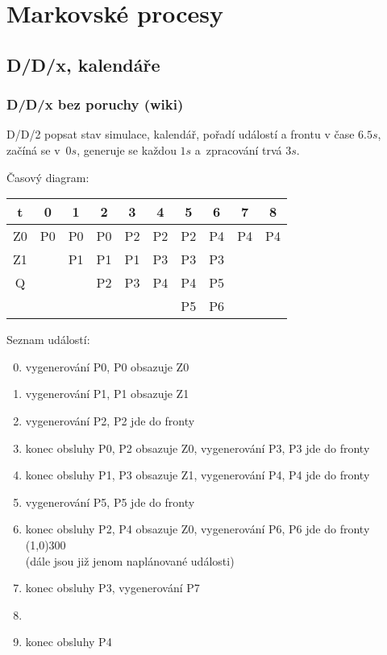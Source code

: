 \documentclass[11pt]{article} %
\begin{document}

\newpage
\section{Markovské procesy}

\subsection{D/D/x, kalendáře}

\subsubsection{D/D/x bez poruchy (wiki)}
D/D/2 popsat stav simulace, kalendář, pořadí událostí a frontu v čase $6.5s$, začíná se v~$0s$, generuje se každou $1s$ a~zpracování trvá $3s$.
\vskip 0.25cm

\noindent
Časový diagram:
\vskip 0.1cm

\begin{tabular}{|c||ccccccc|cc|}
\hline
t & 0 & 1 & 2 & 3 & 4 & 5 & 6 & 7 & 8 \\
\hline
\hline
Z0 & P0 & P0 & P0 & P2 & P2 & P2 & P4 & P4  & P4\\
Z1 & & P1 & P1 & P1 & P3 & P3 & P3 & &\\
\hline
Q & & & P2 & P3 & P4 & P4 & P5 & & \\
 & & & & & & P5 & P6 & & \\
\hline
\end{tabular}

\vskip 0.3cm
\noindent
Seznam událostí:
\begin{enumerate}
\setcounter{enumi}{-1}
\item
 vygenerování P0, P0 obsazuje Z0
\item
 vygenerování P1, P1 obsazuje Z1
\item
 vygenerování P2, P2 jde do fronty
\item
 konec obsluhy P0, P2 obsazuje Z0, vygenerování P3, P3 jde do fronty
\item
 konec obsluhy P1, P3 obsazuje Z1, vygenerování P4, P4 jde do fronty
\item
 vygenerování P5, P5 jde do fronty
\item
 konec obsluhy P2, P4 obsazuje Z0, vygenerování P6, P6 jde do fronty
\\\line(1,0){300}
\\(dále jsou již jenom naplánované události)
\item
 konec obsluhy P3,  vygenerování P7
\item
\item
 konec obsluhy P4
\end{enumerate}
\end{document}
